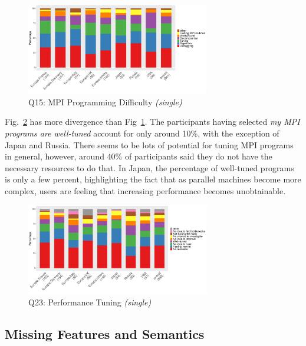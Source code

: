 \documentclass[preprint,5p,times]{elsarticle}
\def\myquote#1{{\it #1}}
\def\countries{contributors\xspace{}}%
\begin{document}
\begin{figure}[tb]
\begin{center}
\includegraphics[width=8.0cm]{R-scripts/Q15.pdf}
\vspace{-1.5mm}
\caption{Q15: MPI Programming Difficulty {\it(single)}}
\label{fig:difficulty}
\vspace{-3mm}%
\end{center}
\end{figure}

Fig.~\ref{fig:tuning} has more divergence than Fig~\ref{fig:difficulty}. The
participants having selected \myquote{my MPI programs are well-tuned} account
for only around 10\%, with the exception of Japan and Russia. There seems to be
lots of potential for tuning MPI programs in general, however, around 40\% of
participants said they do not have the necessary resources to do that. In Japan,
the percentage of well-tuned programs is only a few percent, highlighting the fact
that as parallel machines become more complex, users are feeling that
increasing performance becomes unobtainable.

\begin{figure}[tb]
\begin{center}
\includegraphics[width=8.0cm]{R-scripts/Q23.pdf}
\vspace{-1.5mm}
\caption{Q23: Performance Tuning {\it(single)}}
\label{fig:tuning}
\vspace{-3mm}%
\end{center}
\end{figure}

\subsection{Missing Features and Semantics}
\end{document}
